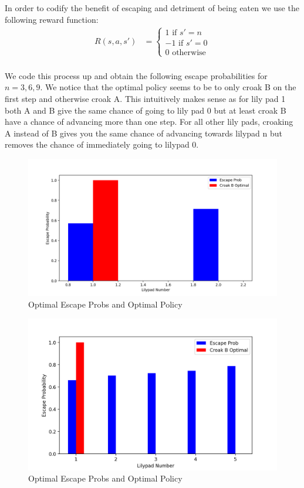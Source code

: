 \documentclass{article}[12pt]
\begin{document}
In order to codify the benefit of escaping and detriment of being eaten we use the following reward function:
\begin{align*}
R(s,a,s') &=  \begin{cases} 1 \text{ if $s'=n$}\\ -1 \text{ if $s'=0$} \\ 0 \text{  otherwise} \end{cases}\\
\end{align*} 

We code this process up and obtain the following escape probabilities for $ n = 3,6,9$. We notice that the optimal policy seems to be to only croak B on the first step and otherwise croak A. This intuitively makes sense as for lily pad 1 both A and B give the same chance of going to lily pad 0 but at least croak B have a chance of advancing more than one step. For all other lily pads, croaking A instead of B gives you the same chance of advancing towards lilypad n but removes the chance of immediately going to lilypad 0.

\begin{figure}
  \includegraphics[width=\linewidth]{llp_3.png}
  \caption{Optimal Escape Probs and Optimal Policy}
  \label{fig:llp3}
\end{figure}

\begin{figure}
  \includegraphics[width=\linewidth]{llp_6.png}
  \caption{Optimal Escape Probs and Optimal Policy}
  \label{fig:llp6}
\end{figure}
\end{document}
